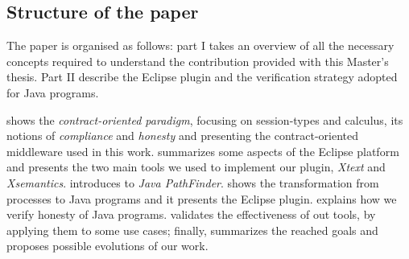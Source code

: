 \subsection*{Structure of the paper}

The paper is organised as follows: part I takes an overview of all the necessary concepts required to understand the contribution provided with this Master's thesis. Part II describe the Eclipse plugin and the verification strategy adopted for Java programs.

 shows the \textit{contract-oriented paradigm}, focusing on session-types and \coco calculus, its notions of \textit{compliance} and \textit{honesty} and presenting the contract-oriented middleware used in this work.
 summarizes some aspects of the Eclipse platform and presents the two main tools we used to implement our plugin, \ie \textit{Xtext}\cite{xtext-site} and \textit{Xsemantics}\cite{xsemantics-site}. 
 introduces to \textit{Java PathFinder}\cite{jpf-site}. 
 shows the transformation from \coco processes to Java programs and it presents the \coco Eclipse plugin.
 explains how we verify honesty of Java programs. 
 validates the effectiveness of out tools, by applying them to some use cases; finally,  summarizes the reached goals and proposes possible evolutions of our work.